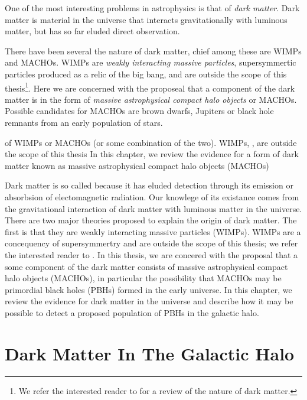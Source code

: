 
One of the most interesting problems in astrophysics is that of \emph{dark
matter}. Dark matter is material in the universe that interacts
gravitationally with luminous matter, but has so far eluded direct
observation. 


There have been several  the nature of dark matter,
chief among these are WIMPs and MACHOs. WIMPs are \emph{weakly interacting
massive particles}, supersymmertic particles produced as a relic of the big
bang, and are outside the scope of this thesis\footnote{We refer the
interested reader to \cite{Griest:1995gs} for a review of the nature of dark
matter.}. Here we are concerned with the proposeal that a component of the
dark matter is in the form of \emph{massive astrophysical compact halo
objects} or MACHOs\cite{Griest:1990vu}. Possible candidates for MACHOs are
brown dwarfs, Jupiters or black hole remnants from an early population of
stars.

of WIMPs or MACHOs (or some combination of the two).  WIMPs, , are outside the scope of this
thesis
In this chapter, we review the evidence for a form of dark matter
known as massive astrophysical compact halo objects (MACHOs)\cite{x}


Dark matter is so called because it has eluded detection through its
emission or absorbsion of electomagnetic radiation. Our knowlege of its
existance comes from the gravitational interaction of dark matter with
luminous matter in the universe. There are two major theories proposed to
explain the origin of dark matter. The first is that they are weakly
interacting massive particles (WIMPs). WIMPs are a concequency of
supersymmertry and are outside the scope of this thesis; we refer the
interested reader to \cite{XXX}.  In this thesis, we are concered with the
proposal that a some component of the dark matter consists of massive
astrophysical compact halo objects (MACHOs), in particular the possibility
that MACHOs may be primordial black holes (PBHs) formed in the early universe.
In this chapter, we review the evidence for dark matter in the universe and
describe how it may be possible to detect a proposed population of PBHs in the
galactic halo.

\section{Dark Matter In The Galactic Halo}

